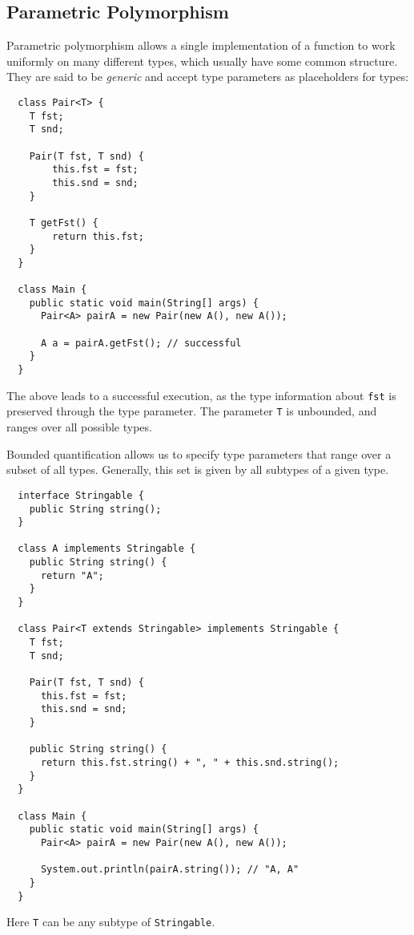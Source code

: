 \subsection{Parametric Polymorphism}

Parametric polymorphism allows a single implementation of a function to work uniformly on many different types, which usually have some common structure. They are said to be \textit{generic} and accept type parameters as placeholders for types:

\begin{verbatim}
  class Pair<T> {
    T fst;
    T snd;
    
    Pair(T fst, T snd) {
        this.fst = fst;
        this.snd = snd;
    }
    
    T getFst() {
        return this.fst;
    }
  }

  class Main {
    public static void main(String[] args) {
      Pair<A> pairA = new Pair(new A(), new A());
        
      A a = pairA.getFst(); // successful
    }
  }
\end{verbatim}
The above leads to a successful execution, as the type information about \texttt{fst} is preserved through the type parameter. The parameter \texttt{T} is unbounded, and ranges over all possible types.

Bounded quantification allows us to specify type parameters that range over a subset of all types. Generally, this set is given by all subtypes of a given type.

\begin{verbatim}
  interface Stringable {
    public String string();
  }

  class A implements Stringable {
    public String string() {
      return "A";
    }
  }

  class Pair<T extends Stringable> implements Stringable {
    T fst;
    T snd;
    
    Pair(T fst, T snd) {
      this.fst = fst;
      this.snd = snd;
    }
    
    public String string() {
      return this.fst.string() + ", " + this.snd.string();
    }
  }

  class Main {
    public static void main(String[] args) {
      Pair<A> pairA = new Pair(new A(), new A());
         
      System.out.println(pairA.string()); // "A, A"
    }
  }
\end{verbatim}
Here \texttt{T} can be any subtype of \texttt{Stringable}.

